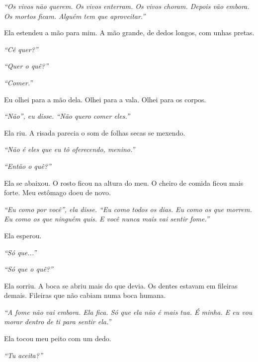\noindent \textit{\textquotedblleft{}Os vivos não querem. Os vivos enterram. Os vivos choram. Depois vão embora. Os mortos ficam. Alguém tem que aproveitar.\textquotedblright{}}

\noindent Ela estendeu a mão para mim. A mão grande, de dedos longos, com unhas pretas.

\noindent \textit{\textquotedblleft{}Cê quer?\textquotedblright{}}

\noindent \textit{\textquotedblleft{}Quer o quê?\textquotedblright{}}

\noindent \textit{\textquotedblleft{}Comer.\textquotedblright{}}

\noindent Eu olhei para a mão dela. Olhei para a vala. Olhei para os corpos.

\noindent \textit{\textquotedblleft{}Não\textquotedblright{}\textit{, eu disse. }\textquotedblleft{}Não quero comer eles.\textquotedblright{}}

\noindent Ela riu. A risada parecia o som de folhas secas se mexendo.

\noindent \textit{\textquotedblleft{}Não é eles que eu tô oferecendo, menino.\textquotedblright{}}

\noindent \textit{\textquotedblleft{}Então o quê?\textquotedblright{}}

\noindent Ela se abaixou. O rosto ficou na altura do meu. O cheiro de comida ficou mais forte. Meu estômago doeu de novo.

\noindent \textit{\textquotedblleft{}Eu como por você\textquotedblright{}\textit{, ela disse. }\textquotedblleft{}Eu como todos os dias. Eu como os que morrem. Eu como os que ninguém quis. E você nunca mais vai sentir fome.\textquotedblright{}}

\noindent Ela esperou.

\noindent \textit{\textquotedblleft{}Só que...\textquotedblright{}}

\noindent \textit{\textquotedblleft{}Só que o quê?\textquotedblright{}}

\noindent Ela sorriu. A boca se abriu mais do que devia. Os dentes estavam em fileiras demais. Fileiras que não cabiam numa boca humana.

\noindent \textit{\textquotedblleft{}A fome não vai embora. Ela fica. Só que ela não é mais tua. É minha. E eu vou morar dentro de ti para sentir ela.\textquotedblright{}}

\noindent Ela tocou meu peito com um dedo.

\noindent \textit{\textquotedblleft{}Tu aceita?\textquotedblright{}}

